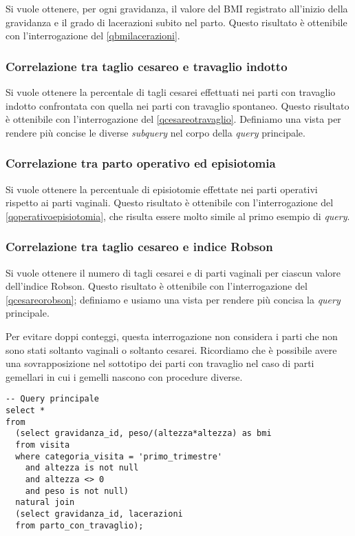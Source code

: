 Si vuole ottenere, per ogni gravidanza, il valore del BMI registrato all'inizio della gravidanza e il grado di lacerazioni subito nel parto.
Questo risultato è ottenibile con l'interrogazione del \lstlistingname{} \ref{qbmilacerazioni}.

\subsubsection{Correlazione tra taglio cesareo e travaglio indotto}

Si vuole ottenere la percentale di tagli cesarei effettuati nei parti con travaglio indotto confrontata con quella nei parti con travaglio spontaneo.
Questo risultato è ottenibile con l'interrogazione del \lstlistingname{} \ref{qcesareotravaglio}.
Definiamo una vista  per rendere più concise le diverse \emph{subquery} nel corpo della \emph{query} principale.

\subsubsection{Correlazione tra parto operativo ed episiotomia}

Si vuole ottenere la percentuale di episiotomie effettate nei parti operativi rispetto ai parti vaginali.
Questo risultato è ottenibile con l'interrogazione del \lstlistingname{} \ref{qoperativoepisiotomia}, che risulta essere molto simile al primo esempio di \emph{query}.

\subsubsection{Correlazione tra taglio cesareo e indice Robson}

Si vuole ottenere il numero di tagli cesarei e di parti vaginali per ciascun valore dell'indice Robson.
Questo risultato è ottenibile con l'interrogazione del \lstlistingname{} \ref{qcesareorobson}; definiamo e usiamo una vista  per rendere più concisa la \emph{query} principale.

Per evitare doppi conteggi, questa interrogazione non considera i parti che non sono stati soltanto vaginali o soltanto cesarei.
Ricordiamo che è possibile avere una sovrapposizione nel sottotipo dei parti con travaglio nel caso di parti gemellari in cui i gemelli nascono con procedure diverse.

\begin{lstlisting}[float,caption={Esempio di \emph{query}. Valori di BMI e lacerazioni.},label=qbmilacerazioni]
-- Query principale
select *
from
  (select gravidanza_id, peso/(altezza*altezza) as bmi
  from visita
  where categoria_visita = 'primo_trimestre'
    and altezza is not null
    and altezza <> 0
    and peso is not null)
  natural join
  (select gravidanza_id, lacerazioni
  from parto_con_travaglio);
\end{lstlisting}

